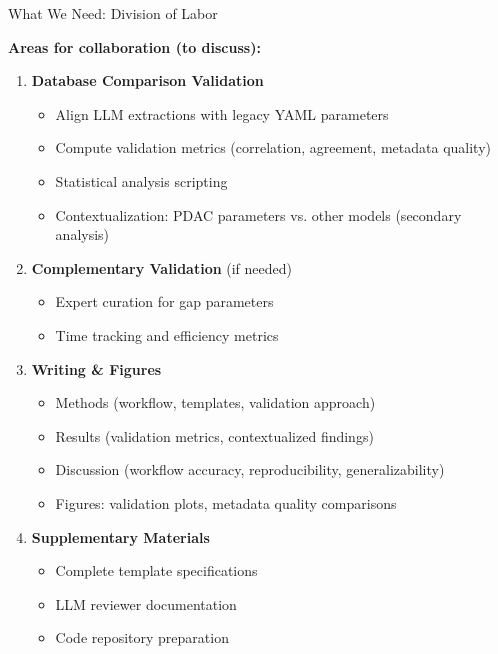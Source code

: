 \documentclass[10pt]{beamer}
\begin{document}
\begin{frame}{What We Need: Division of Labor}

  \textbf{Areas for collaboration (to discuss):}

  \vspace{0.3cm}

  \begin{enumerate}
    \item \textbf{Database Comparison Validation}
    \begin{itemize}
      \item Align LLM extractions with legacy YAML parameters
      \item Compute validation metrics (correlation, agreement, metadata quality)
      \item Statistical analysis scripting
      \item Contextualization: PDAC parameters vs. other models (secondary analysis)
    \end{itemize}

    \item \textbf{Complementary Validation} (if needed)
    \begin{itemize}
      \item Expert curation for gap parameters
      \item Time tracking and efficiency metrics
    \end{itemize}

    \item \textbf{Writing \& Figures}
    \begin{itemize}
      \item Methods (workflow, templates, validation approach)
      \item Results (validation metrics, contextualized findings)
      \item Discussion (workflow accuracy, reproducibility, generalizability)
      \item Figures: validation plots, metadata quality comparisons
    \end{itemize}

    \item \textbf{Supplementary Materials}
    \begin{itemize}
      \item Complete template specifications
      \item LLM reviewer documentation
      \item Code repository preparation
    \end{itemize}
  \end{enumerate}

\end{frame}
\end{document}
